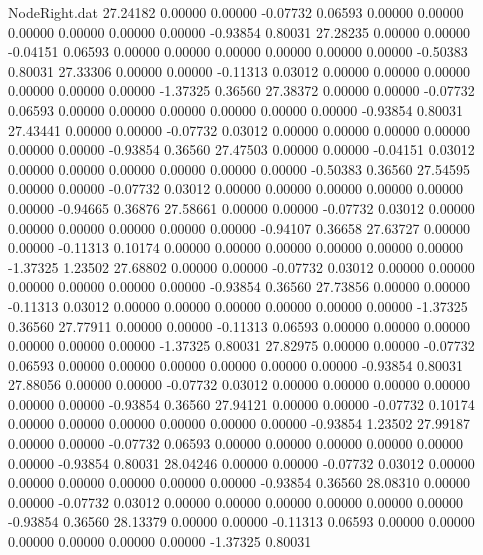 \begin{filecontents}{NodeRight.dat}
  27.24182    0.00000    0.00000    -0.07732    0.06593    0.00000    0.00000    0.00000    0.00000    0.00000    0.00000   -0.93854    0.80031
  27.28235    0.00000    0.00000    -0.04151    0.06593    0.00000    0.00000    0.00000    0.00000    0.00000    0.00000   -0.50383    0.80031
  27.33306    0.00000    0.00000    -0.11313    0.03012    0.00000    0.00000    0.00000    0.00000    0.00000    0.00000   -1.37325    0.36560
  27.38372    0.00000    0.00000    -0.07732    0.06593    0.00000    0.00000    0.00000    0.00000    0.00000    0.00000   -0.93854    0.80031
  27.43441    0.00000    0.00000    -0.07732    0.03012    0.00000    0.00000    0.00000    0.00000    0.00000    0.00000   -0.93854    0.36560
  27.47503    0.00000    0.00000    -0.04151    0.03012    0.00000    0.00000    0.00000    0.00000    0.00000    0.00000   -0.50383    0.36560
  27.54595    0.00000    0.00000    -0.07732    0.03012    0.00000    0.00000    0.00000    0.00000    0.00000    0.00000   -0.94665    0.36876
  27.58661    0.00000    0.00000    -0.07732    0.03012    0.00000    0.00000    0.00000    0.00000    0.00000    0.00000   -0.94107    0.36658
  27.63727    0.00000    0.00000    -0.11313    0.10174    0.00000    0.00000    0.00000    0.00000    0.00000    0.00000   -1.37325    1.23502
  27.68802    0.00000    0.00000    -0.07732    0.03012    0.00000    0.00000    0.00000    0.00000    0.00000    0.00000   -0.93854    0.36560
  27.73856    0.00000    0.00000    -0.11313    0.03012    0.00000    0.00000    0.00000    0.00000    0.00000    0.00000   -1.37325    0.36560
  27.77911    0.00000    0.00000    -0.11313    0.06593    0.00000    0.00000    0.00000    0.00000    0.00000    0.00000   -1.37325    0.80031
  27.82975    0.00000    0.00000    -0.07732    0.06593    0.00000    0.00000    0.00000    0.00000    0.00000    0.00000   -0.93854    0.80031
  27.88056    0.00000    0.00000    -0.07732    0.03012    0.00000    0.00000    0.00000    0.00000    0.00000    0.00000   -0.93854    0.36560
  27.94121    0.00000    0.00000    -0.07732    0.10174    0.00000    0.00000    0.00000    0.00000    0.00000    0.00000   -0.93854    1.23502
  27.99187    0.00000    0.00000    -0.07732    0.06593    0.00000    0.00000    0.00000    0.00000    0.00000    0.00000   -0.93854    0.80031
  28.04246    0.00000    0.00000    -0.07732    0.03012    0.00000    0.00000    0.00000    0.00000    0.00000    0.00000   -0.93854    0.36560
  28.08310    0.00000    0.00000    -0.07732    0.03012    0.00000    0.00000    0.00000    0.00000    0.00000    0.00000   -0.93854    0.36560
  28.13379    0.00000    0.00000    -0.11313    0.06593    0.00000    0.00000    0.00000    0.00000    0.00000    0.00000   -1.37325    0.80031

\end{filecontents}
